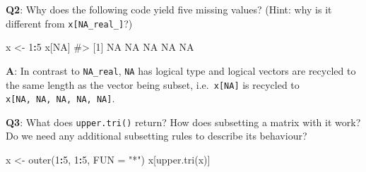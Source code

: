\documentclass[
]{krantz}
\makeatletter
\newenvironment{Shaded}{\begin{snugshade}}{\end{snugshade}}
\newcommand{\CommentTok}[1]{\textcolor[rgb]{0.56,0.35,0.01}{\textit{#1}}}
\newcommand{\DataTypeTok}[1]{\textcolor[rgb]{0.13,0.29,0.53}{#1}}
\newcommand{\DecValTok}[1]{\textcolor[rgb]{0.00,0.00,0.81}{#1}}
\newcommand{\KeywordTok}[1]{\textcolor[rgb]{0.13,0.29,0.53}{\textbf{#1}}}
\newcommand{\NormalTok}[1]{#1}
\newcommand{\OperatorTok}[1]{\textcolor[rgb]{0.81,0.36,0.00}{\textbf{#1}}}
\newcommand{\OtherTok}[1]{\textcolor[rgb]{0.56,0.35,0.01}{#1}}
\newcommand{\StringTok}[1]{\textcolor[rgb]{0.31,0.60,0.02}{#1}}
\newenvironment{kframe}{%
\medskip{}
\setlength{\fboxsep}{.8em}
 \def\at@end@of@kframe{}%
 \ifinner\ifhmode%
  \def\at@end@of@kframe{\end{minipage}}%
  \begin{minipage}{\columnwidth}%
 \fi\fi%
 \def\FrameCommand##1{\hskip\@totalleftmargin \hskip-\fboxsep
 \colorbox{shadecolor}{##1}\hskip-\fboxsep
     \hskip-\linewidth \hskip-\@totalleftmargin \hskip\columnwidth}%
 \MakeFramed {\advance\hsize-\width
   \@totalleftmargin\z@ \linewidth\hsize
   \@setminipage}}%
 {\par\unskip\endMakeFramed%
 \at@end@of@kframe}
\renewenvironment{Shaded}{\begin{kframe}}{\end{kframe}}
\renewcommand{\KeywordTok} [1]{\textcolor[rgb]{0.00,0.44,0.13}{{#1}}}
\renewcommand{\DataTypeTok}[1]{\textcolor[rgb]{0.56,0.13,0.00}{{#1}}}
\renewcommand{\DecValTok}  [1]{\textcolor[rgb]{0.25,0.63,0.44}{{#1}}}
\renewcommand{\StringTok}  [1]{\textcolor[rgb]{0.25,0.44,0.63}{{#1}}}
\renewcommand{\CommentTok} [1]{\textcolor[rgb]{0.38,0.63,0.69}{{#1}}}
\renewcommand{\OtherTok}   [1]{\textcolor[rgb]{0.00,0.44,0.13}{{#1}}}
\renewcommand{\NormalTok}  [1]{{#1}}
\makeatother
\begin{document}
\begin{Shaded}
\end{Shaded}

\textbf{{Q2}}: Why does the following code yield five missing values? (Hint: why is it different from \texttt{x{[}NA\_real\_{]}}?)

\begin{Shaded}
\begin{Highlighting}[]
\NormalTok{x <-}\StringTok{ }\DecValTok{1}\OperatorTok{:}\DecValTok{5}
\NormalTok{x[}\OtherTok{NA}\NormalTok{]}
\CommentTok{#> [1] NA NA NA NA NA}
\end{Highlighting}
\end{Shaded}

\textbf{{A}}: In contrast to \texttt{NA\_real}, \texttt{NA} has logical type and logical vectors are recycled to the same length as the vector being subset, i.e.~\texttt{x{[}NA{]}} is recycled to \texttt{x{[}NA,\ NA,\ NA,\ NA,\ NA{]}}.

\textbf{{Q3}}: What does \texttt{upper.tri()} return? How does subsetting a matrix with it work? Do we need any additional subsetting rules to describe its behaviour?

\begin{Shaded}
\begin{Highlighting}[]
\NormalTok{x <-}\StringTok{ }\KeywordTok{outer}\NormalTok{(}\DecValTok{1}\OperatorTok{:}\DecValTok{5}\NormalTok{, }\DecValTok{1}\OperatorTok{:}\DecValTok{5}\NormalTok{, }\DataTypeTok{FUN =} \StringTok{"*"}\NormalTok{)}
\NormalTok{x[}\KeywordTok{upper.tri}\NormalTok{(x)]}
\end{Highlighting}
\end{Shaded}
\end{document}
